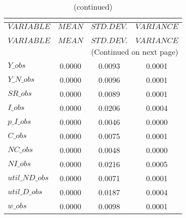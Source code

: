  
\begin{center}
\begin{longtable}{lccc} 
\caption{THEORETICAL MOMENTS}\\
 \label{Table:th_moments}\\
\toprule 
$VARIABLE       $	 & 	 $         MEAN$	 & 	 $    STD. DEV.$	 & 	 $     VARIANCE$\\
\midrule \endfirsthead 
\caption{(continued)}\\
 \toprule \\ 
$VARIABLE       $	 & 	 $         MEAN$	 & 	 $    STD. DEV.$	 & 	 $     VARIANCE$\\
\midrule \endhead 
\midrule \multicolumn{4}{r}{(Continued on next page)} \\ \bottomrule \endfoot 
\bottomrule \endlastfoot 
$Y\_obs         $	 & 	       0.0000	 & 	       0.0093	 & 	       0.0001 \\ 
$Y\_N\_obs      $	 & 	       0.0000	 & 	       0.0096	 & 	       0.0001 \\ 
$SR\_obs        $	 & 	       0.0000	 & 	       0.0089	 & 	       0.0001 \\ 
$I\_obs         $	 & 	       0.0000	 & 	       0.0206	 & 	       0.0004 \\ 
$p\_I\_obs      $	 & 	       0.0000	 & 	       0.0046	 & 	       0.0000 \\ 
$C\_obs         $	 & 	       0.0000	 & 	       0.0075	 & 	       0.0001 \\ 
$NC\_obs        $	 & 	       0.0000	 & 	       0.0048	 & 	       0.0000 \\ 
$NI\_obs        $	 & 	       0.0000	 & 	       0.0216	 & 	       0.0005 \\ 
$util\_ND\_obs  $	 & 	       0.0000	 & 	       0.0071	 & 	       0.0001 \\ 
$util\_D\_obs   $	 & 	       0.0000	 & 	       0.0187	 & 	       0.0004 \\ 
$w\_obs         $	 & 	       0.0000	 & 	       0.0098	 & 	       0.0001 \\ 
\end{longtable}
 \end{center}
